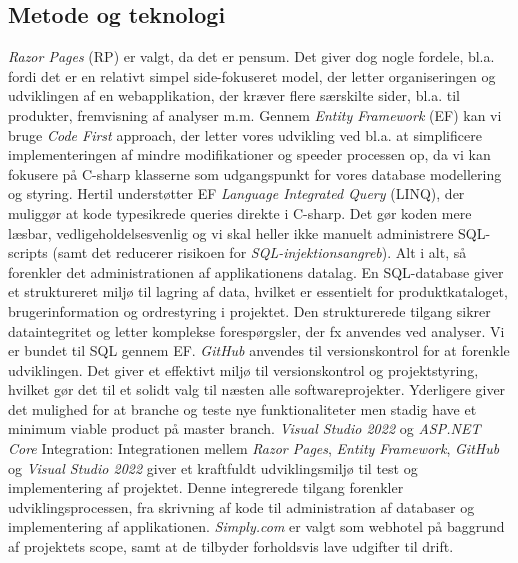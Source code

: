 \subsection{Metode og teknologi}
\label{sec:metode-teknologi}
\emph{Razor Pages} (RP) er valgt, da det er pensum. 
Det giver dog nogle fordele, bl.a. fordi det er en relativt simpel side-fokuseret model, der letter organiseringen og udviklingen af en webapplikation, der kræver flere særskilte sider, bl.a. til produkter, fremvisning af analyser m.m. 
Gennem \emph{Entity Framework} (EF) kan vi bruge \emph{Code First} approach, der letter vores udvikling ved bl.a. at simplificere implementeringen af mindre modifikationer og speeder processen op, 
da vi kan fokusere på C-sharp klasserne som udgangspunkt for vores database modellering og styring. Hertil understøtter EF \emph{Language Integrated Query} (LINQ), der muliggør at kode typesikrede queries direkte i C-sharp. 
Det gør koden mere læsbar, vedligeholdelsesvenlig og vi skal heller ikke manuelt administrere SQL-scripts (samt det reducerer risikoen for \emph{SQL-injektionsangreb}). 
Alt i alt, så forenkler det administrationen af applikationens datalag. En SQL-database giver et struktureret miljø til lagring af data, hvilket er essentielt for produktkataloget, brugerinformation og ordrestyring i projektet. 
Den strukturerede tilgang sikrer dataintegritet og letter komplekse forespørgsler, der fx anvendes ved analyser. Vi er bundet til SQL gennem EF.
\emph{GitHub} anvendes til versionskontrol for at forenkle udviklingen. Det giver et effektivt miljø til versionskontrol og projektstyring, hvilket gør det til et solidt valg til næsten alle softwareprojekter. 
Yderligere giver det mulighed for at branche og teste nye funktionaliteter men stadig have et minimum viable product på master branch. 
\emph{Visual Studio 2022} og \emph{ASP.NET Core} Integration: Integrationen mellem \emph{Razor Pages}, \emph{Entity Framework}, \emph{GitHub} og \emph{Visual Studio 2022} giver et kraftfuldt udviklingsmiljø til test og implementering af projektet. 
Denne integrerede tilgang forenkler udviklingsprocessen, fra skrivning af kode til administration af databaser og implementering af applikationen.
\emph{Simply.com} er valgt som webhotel på baggrund af projektets scope, samt at de tilbyder forholdsvis lave udgifter til drift.